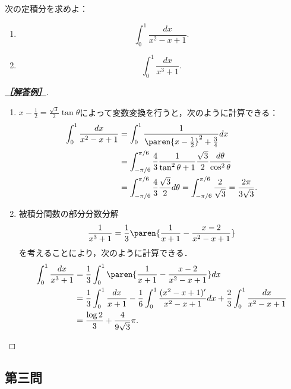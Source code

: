 \documentclass[uplatex,dvipdfmx]{jsarticle}
\begin{document}
\begin{tcolorbox}[colframe=ForestGreen, colback=ForestGreen!10!white,breakable,colbacktitle=ForestGreen!40!white,coltitle=black,fonttitle=\bfseries\sffamily,
    title=第２問]
    \begin{problem}
        次の定積分を求めよ：
        \begin{enumerate}
            \item \[\int^1_0\frac{dx}{x^2-x+1}.\]
            \item \[\int^1_0\frac{dx}{x^3+1}.\]
        \end{enumerate}
    \end{problem}
\end{tcolorbox}
\begin{proof}[\textbf{\underline{［解答例］}}]\mbox{}
    \begin{enumerate}
        \item $x-\frac{1}{2}=\frac{\sqrt{3}}{2}\tan\theta$によって変数変換を行うと，次のように計算できる：
        \begin{align*}
            \int^1_0\frac{dx}{x^2-x+1}&=\int^1_0\frac{1}{\paren{x-\frac{1}{2}}^2+\frac{3}{4}}dx\\
            &=\int^{\pi/6}_{-\pi/6}\frac{4}{3}\frac{1}{\tan^2\theta+1}\frac{\sqrt{3}}{2}\frac{d\theta}{\cos^2\theta}\\
            &=\int^{\pi/6}_{-\pi/6}\frac{4}{3}\frac{\sqrt{3}}{2}d\theta
            =\int^{\pi/6}_{-\pi/6}\frac{2}{\sqrt{3}}=\frac{2\pi}{3\sqrt{3}}.
        \end{align*}
        \item 被積分関数の部分分数分解
        \[\frac{1}{x^3+1}=\frac{1}{3}\paren{\frac{1}{x+1}-\frac{x-2}{x^2-x+1}}\]
        を考えることにより，次のように計算できる．
        \begin{align*}
            \int^1_0\frac{dx}{x^3+1}&=\frac{1}{3}\int^1_0\paren{\frac{1}{x+1}-\frac{x-2}{x^2-x+1}}dx\\
            &=\frac{1}{3}\int^1_0\frac{dx}{x+1}-\frac{1}{6}\int^1_0\frac{(x^2-x+1)'}{x^2-x+1}dx+\frac{2}{3}\int^1_0\frac{dx}{x^2-x+1}\\
            &=\frac{\log 2}{3}+\frac{4}{9\sqrt{3}}\pi.
        \end{align*}
    \end{enumerate}
\end{proof}

\subsection{第三問}
\end{document}
